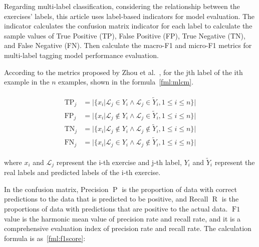 
Regarding multi-label classification, considering the relationship between the exercises' labels, this article uses label-based indicators for model evaluation. The indicator calculates the confusion matrix indicator for each label to calculate the sample values of True Positive (TP), False Positive (FP), True Negative (TN), and False Negative (FN). Then calculate the macro-F1 and micro-F1 metrics for multi-label tagging model performance evaluation.

According to the metrics proposed by Zhou et al.~\cite{zhang2013review}, for the jth label of the ith example in the \(n\) examples, shown in the formula~\ref{fml:mlcm}.

\begin{align}\label{fml:mlcm}
	\begin{split}
		\operatorname{TP}_j & =| \{x_i| \mathcal{L}_j\in Y_{i}\wedge \mathcal{L}_j \in \tilde{Y}_i , 1\leq i \leq n\}|       \\
		\operatorname{FP}_j & =| \{x_i| \mathcal{L}_j\notin Y_{i}\wedge \mathcal{L}_j \in \tilde{Y}_i , 1\leq i \leq n\}|    \\
		\operatorname{TN}_j & =| \{x_i| \mathcal{L}_j\notin Y_{i}\wedge \mathcal{L}_j \notin \tilde{Y}_i , 1\leq i \leq n\}| \\
		\operatorname{FN}_j & =| \{x_i| \mathcal{L}_j\in Y_{i}\wedge \mathcal{L}_j \notin \tilde{Y}_i , 1\leq i \leq n\}|
	\end{split}
\end{align}

where \(x_i\) and \(\mathcal{L}_j\) represent the i-th exercise and j-th label, \(Y_i\) and \(\tilde{Y}_i\) represent the real labels and predicted labels of the i-th exercise.


In the confusion matrix, Precision \(\operatorname{P}\) is the proportion of data with correct predictions to the data that is predicted to be positive, and Recall \(\operatorname{R}\) is the proportions of data with predictions that are positive to the actual data. \(\operatorname{F1}\) value is the harmonic mean value of precision rate and recall rate, and it is a comprehensive evaluation index of precision rate and recall rate. The calculation formula is as~\ref{fml:f1score}:

